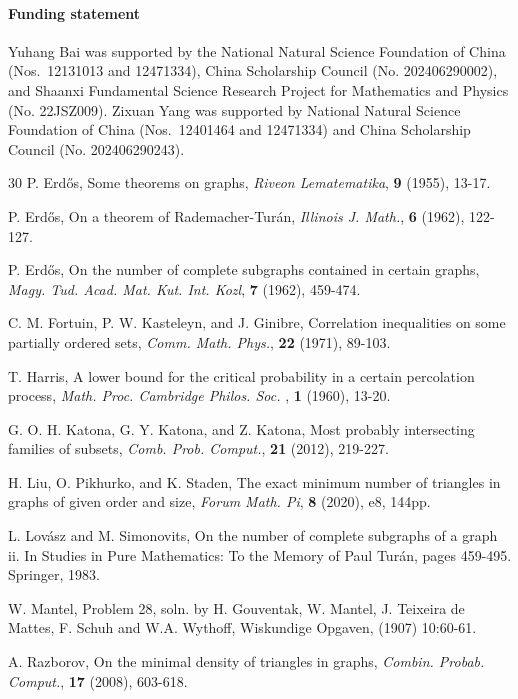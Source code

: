 \documentclass[11pt,a4paper]{article}
\begin{document}
\medskip
\paragraph{Funding statement}

Yuhang Bai was supported by the National Natural Science Foundation of China (Nos.~12131013 and 12471334), China Scholarship Council (No. 202406290002), and  Shaanxi Fundamental Science Research Project for Mathematics and Physics (No. 22JSZ009). Zixuan Yang was supported by  National Natural Science Foundation of China (Nos.~12401464 and 12471334) and China Scholarship Council (No. 202406290243). 



\begin{thebibliography}{30}
 P. Erd\H{o}s, Some theorems on graphs,  \emph{Riveon Lematematika}, \textbf{9} (1955), 13-17.


 P. Erd\H{o}s, On a theorem of Rademacher-Tur\'{a}n,  \emph{Illinois J. Math.}, \textbf{6} (1962), 122-127.


 P. Erd\H{o}s,   On the number of complete subgraphs contained in certain graphs, \emph{Magy.
Tud. Acad. Mat. Kut. Int. Kozl}, \textbf{7} (1962), 459-474.


  C. M. Fortuin, P. W. Kasteleyn, and J. Ginibre, Correlation inequalities on some partially ordered sets, \emph{Comm. Math. Phys.}, \textbf{22} (1971), 89-103.




 T. Harris,  A lower bound for the critical probability in a certain percolation process, \emph{Math. Proc. Cambridge Philos. Soc. }, \textbf{1} (1960),  13-20.


 G. O. H. Katona, G. Y. Katona, and Z. Katona, Most probably intersecting families
of subsets, \emph{Comb. Prob. Comput.}, \textbf{21} (2012), 219-227.



 H. Liu, O. Pikhurko, and K. Staden, The exact minimum number of triangles in
graphs of given order and size,  \emph{Forum Math. Pi}, \textbf{8} (2020), e8, 144pp.


  L. Lov\'{a}sz and M. Simonovits, On the number of complete subgraphs of a graph ii. In Studies
in Pure Mathematics: To the Memory of Paul Tur\'{a}n, pages 459-495. Springer, 1983.



 W. Mantel,  Problem 28, soln. by H. Gouventak, W. Mantel, J. Teixeira de Mattes, F. Schuh and W.A. Wythoff, Wiskundige Opgaven,  (1907) 10:60-61.


 A. Razborov, On the minimal density of triangles in graphs, \emph{Combin. Probab.
Comput.}, \textbf{17} (2008), 603-618.

\end{thebibliography}
\end{document}
